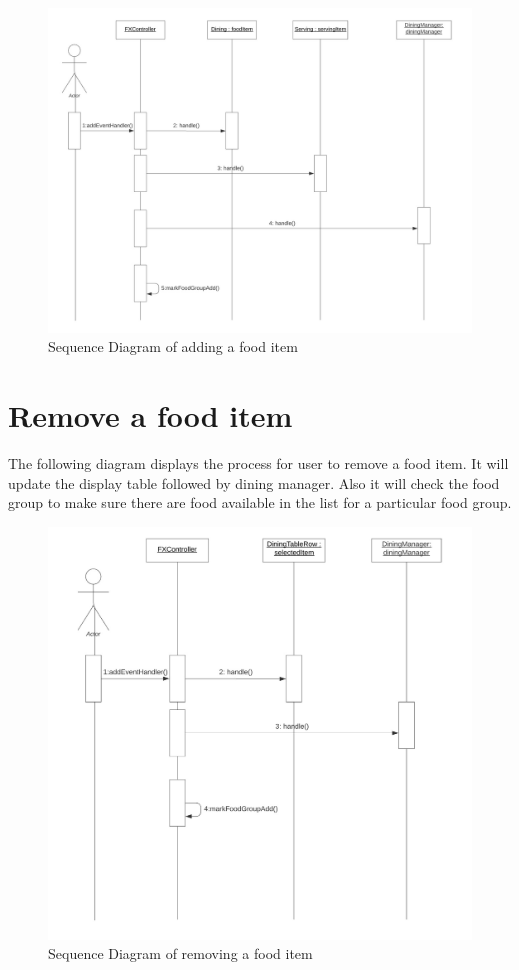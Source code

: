 \documentclass{scrreprt}
\begin{document}
\begin{figure}[!htbp]
\centering
\includegraphics[width=15cm]{pictures/add-food-sd.png}
\caption*{Sequence Diagram of adding a food item}
\end{figure}

\FloatBarrier

\section{Remove a food item}

The following diagram displays the process for user to remove a food item. It will update the display table followed by dining manager. Also it will check the food group to make sure there are food available in the list for a particular food group.
\begin{figure}[!htbp]
\centering
\includegraphics[width=15cm]{pictures/remove-food-sd.png}
\caption*{Sequence Diagram of removing a food item}
\end{figure}
\end{document}
